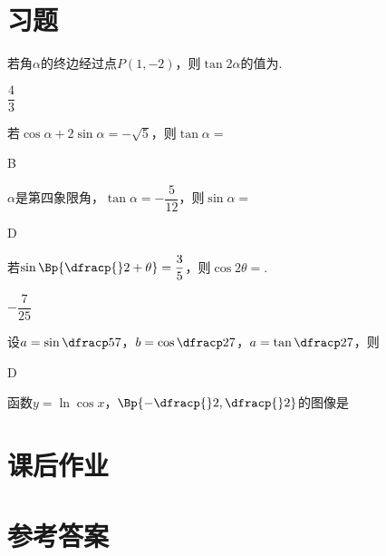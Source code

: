 \section{习题}
  \begin{exercise}
    \item%
      若角$\alpha$的终边经过点$P(1,-2)$，则$\tan{2\alpha}$的值为\tk.
      \begin{answer}
        $\dfrac43$
      \end{answer}
    \item%
      若$\cos\alpha+2\sin\alpha=-\sqrt{5}$，则$\tan\alpha=$\xz
      \begin{answer}
        B
      \end{answer}
    \item%
      $\alpha$是第四象限角，$\tan\alpha=-\dfrac5{12}$，则$\sin\alpha=$\xz
      \begin{answer}
        D
      \end{answer}
    \item%
      若$\sin\Bp{\dfracp{}2+\theta}=\dfrac35$，则$\cos{2\theta}=$\tk.
      \begin{answer}
        $-\dfrac7{25}$
      \end{answer}
    \item%
      设$a=\sin{\dfracp57}$，$b=\cos{\dfracp27}$，$a=\tan{\dfracp27}$，则\xz
      \begin{answer}
        D
      \end{answer}
    \item%
      函数$y=\ln\cos x$，$\Bp{-\dfracp{}2,\dfracp{}2}$的图像是\xz
  \end{exercise}
\newpage
\section{课后作业}
  \begin{exercise}

  \end{exercise}
\stopexercise

\newpage
\section{参考答案}
\begin{multicols}{2}
  \printanswer
\end{multicols}
